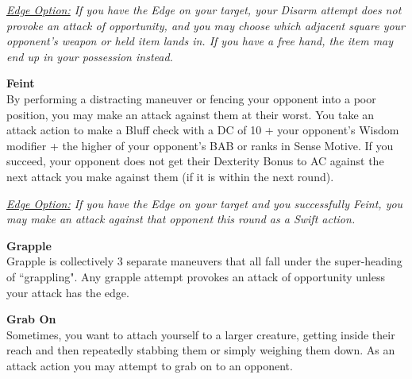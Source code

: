 

\smallskip\emph{\underline{Edge Option:} If you have the Edge on your target, your Disarm attempt does not provoke an attack of opportunity, and you may choose which adjacent square your opponent's weapon or held item lands in. If you have a free hand, the item may end up in your possession instead.}\\

\hypertarget{combat:feint}{}
\normalsize\item\textbf{{Feint}}\\\small
By performing a distracting maneuver or fencing your opponent into a poor position, you may make an attack against them at their worst. You take an attack action to make a Bluff check with a DC of 10 + your opponent's Wisdom modifier + the higher of your opponent's BAB or ranks in Sense Motive. If you succeed, your opponent does not get their Dexterity Bonus to AC against the next attack you make against them (if it is within the next round).

\smallskip\emph{\underline{Edge Option:} If you have the Edge on your target and you successfully Feint, you may make an attack against that opponent this round as a Swift action.}\\

\hypertarget{combat:grapple}{}
\normalsize\item\textbf{{Grapple}}\\\small
Grapple is collectively 3 separate maneuvers that all fall under the super-heading of ``grappling". Any grapple attempt provokes an attack of opportunity unless your attack has the edge.

\listtwo\hypertarget{combat:grabon}{}
      \normalsize\item\textbf{{Grab On}}\\\small
      Sometimes, you want to attach yourself to a larger creature, getting inside their reach and then repeatedly stabbing them or simply weighing them down.  As an attack action you may attempt to grab on to an opponent.

